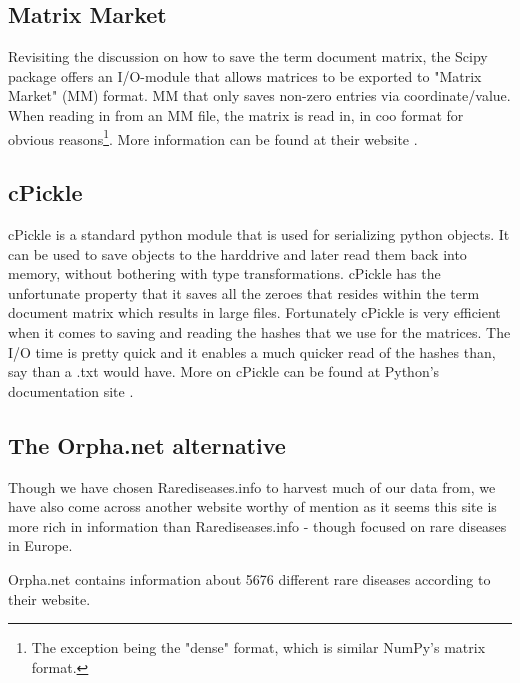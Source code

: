 \subsection{Matrix Market\label{MatrixMarket}}

Revisiting the discussion on how to save the term document matrix, the
Scipy package \cite{SciPy} offers an I/O-module that allows matrices
to be exported to "Matrix Market" (MM) format. MM that only saves
non-zero entries via coordinate/value. When reading in from an MM
file, the matrix is read in, in coo format for obvious
reasons\footnote{The exception being the "dense" format, which is
  similar NumPy's matrix format.}. More information can be found at
their website \cite{MatrixMarket}.

\subsection{cPickle}

cPickle is a standard python module that is used for serializing
python objects. It can be used to save objects to the harddrive and
later read them back into memory, without bothering with type
transformations. cPickle has the unfortunate property that it saves
all the zeroes that resides within the term document matrix which
results in large files. Fortunately cPickle is very efficient when it
comes to saving and reading the hashes that we use for the
matrices. The I/O time is pretty quick and it enables a much quicker
read of the hashes than, say than a .txt would have. More on cPickle
can be found at Python's documentation site \cite{cPicklePython}.

\subsection{The Orpha.net alternative}

Though we have chosen Rarediseases.info to harvest much of our data
from, we have also come across another website worthy of mention as it
seems this site is more rich in information than Rarediseases.info -
though focused on rare diseases in Europe.

Orpha.net contains information about 5676 different rare diseases according to their website.
